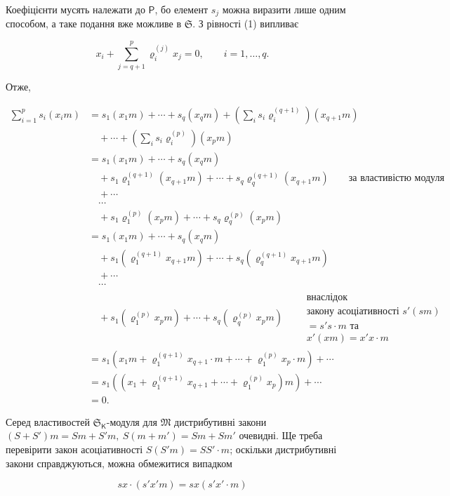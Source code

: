 \documentclass[11pt]{article}
\begin{document}
Коефіцієнти мусять належати до \(\mathsf P\), бо елемент \(s_j\) можна виразити лише одним способом, а таке подання вже можливе в \(\mathfrak S\). З рівності (1) випливає

\[
x_i+\sum_{j=q+1}^{p}\varrho_i^{(j)}x_j=0,\qquad i=1,\ldots,q.
\]

Отже,

\[
\begin{aligned}
\sum_{i=1}^{p}s_i(x_i m)
&=s_1(x_1m)+\cdots+s_q(x_qm)
  +\left(\sum_i s_i\varrho_i^{(q+1)}\right)(x_{q+1}m)\\
&\quad+\cdots+\left(\sum_i s_i\varrho_i^{(p)}\right)(x_pm)\\
&=s_1(x_1m)+\cdots+s_q(x_qm)\\
&\quad+s_1\varrho_1^{(q+1)}(x_{q+1}m)+\cdots+s_q\varrho_q^{(q+1)}(x_{q+1}m)
  \qquad\text{за властивістю модуля}\\
&\quad+\cdots\\
&\quad\cdots\\
&\quad+s_1\varrho_1^{(p)}(x_pm)+\cdots+s_q\varrho_q^{(p)}(x_pm)\\
&=s_1(x_1m)+\cdots+s_q(x_qm)\\
&\quad+s_1(\varrho_1^{(q+1)}x_{q+1}m)+\cdots+s_q(\varrho_q^{(q+1)}x_{q+1}m)\\
&\quad+\cdots\\
&\quad\cdots\\
&\quad+s_1(\varrho_1^{(p)}x_pm)+\cdots+s_q(\varrho_q^{(p)}x_pm)
  \qquad\begin{gathered}\text{внаслідок}\\ \text{закону асоціативності }s'(sm)\\ =s's\cdot m\text{ та}\\ x'(xm)=x'x\cdot m\end{gathered}\\
&=s_1\left(x_1m+\varrho_1^{(q+1)}x_{q+1}\cdot m+\cdots+\varrho_1^{(p)}x_p\cdot m\right)+\cdots\\
&=s_1\left(\left(x_1+\varrho_1^{(q+1)}x_{q+1}+\cdots+\varrho_1^{(p)}x_p\right)m\right)+\cdots\\
&=0.
\end{aligned}
\]


Серед властивостей \(\mathfrak S_{\mathsf K}\)-модуля для \(\mathfrak M\) дистрибутивні закони \((S+S')m=Sm+S'm,\ S(m+m')=Sm+Sm'\) очевидні. Ще треба перевірити закон асоціативності \(S(S'm)=SS'\cdot m\); оскільки дистрибутивні закони справджуються, можна обмежитися випадком

\[
sx\cdot(s'x' m)=sx(s'x'\cdot m)
\]
\end{document}
